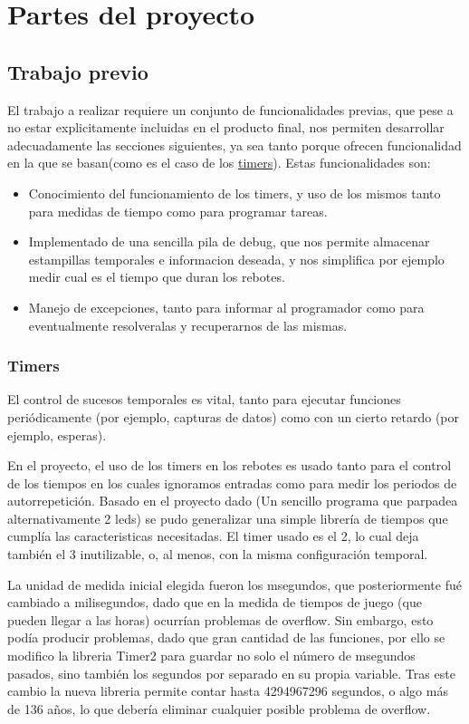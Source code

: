 \documentclass[12pt,letterpaper]{article}
\begin{document}
\section{Partes del proyecto}
\label{sec:partes}
\subsection{Trabajo previo}
\label{subsec:previous}
El trabajo a realizar requiere un conjunto de funcionalidades previas,
que pese a no estar explicitamente incluidas en el producto final, nos
permiten desarrollar adecuadamente las secciones siguientes, ya sea tanto porque ofrecen funcionalidad en la que se basan(como es el caso de los \hyperref[subsubsec:timers]{timers}). Estas
funcionalidades son:
\begin{itemize}
  \item Conocimiento del funcionamiento de los timers, y uso de los
    mismos tanto para medidas de tiempo como para programar tareas.
  \item Implementado de una sencilla pila de debug, que nos permite
    almacenar estampillas temporales e informacion deseada, y nos
    simplifica por ejemplo medir cual es el tiempo que duran los
    rebotes.
  \item Manejo de excepciones, tanto para informar al programador como
    para eventualmente resolveralas y recuperarnos de las mismas.
\end{itemize}

\subsubsection{Timers}
\label{subsubsec:timers}
El control de sucesos temporales es vital, tanto para ejecutar
funciones periódicamente (por ejemplo, capturas de datos) como con un
cierto retardo (por ejemplo, esperas).

En el proyecto, el uso de los timers en los rebotes es usado tanto
para el control de los tiempos en los cuales ignoramos entradas como
para medir los periodos de autorrepetición. Basado en el proyecto dado
(Un sencillo programa que parpadea alternativamente 2 leds) se pudo
generalizar una simple librería de tiempos que cumplía las
caracteristicas necesitadas. El timer usado es el 2, lo cual deja
también el 3 inutilizable, o, al menos, con la misma configuración
temporal.

La unidad de medida inicial elegida fueron los \textgreek{m}segundos,
que posteriormente fué cambiado a milisegundos, dado que en la medida
de tiempos de juego (que pueden llegar a las horas) ocurrían problemas
de overflow. Sin embargo, esto podía producir problemas, dado que gran
cantidad de las funciones, por ello se modifico la libreria Timer2
para guardar no solo el número de \textgreek{m}segundos pasados, sino
también los segundos por separado en su propia variable. Tras este
cambio la nueva libreria permite contar hasta 4294967296 segundos, o
algo más de 136 años, lo que debería eliminar cualquier posible
problema de overflow.
\end{document}
